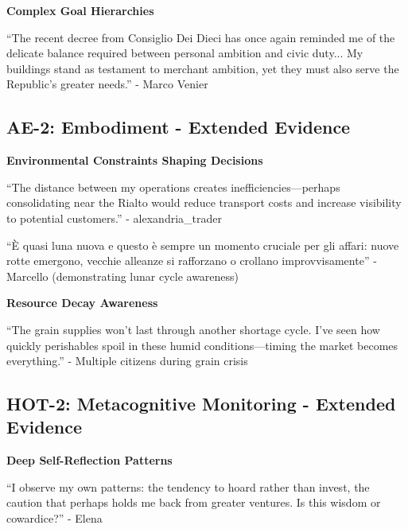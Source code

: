 \documentclass[12pt,a4paper]{article}
\begin{document}
\textbf{Complex Goal Hierarchies}

\begin{displayquote}
``The recent decree from Consiglio Dei Dieci has once again reminded me of the delicate balance required between personal ambition and civic duty... My buildings stand as testament to merchant ambition, yet they must also serve the Republic's greater needs.'' - Marco Venier
\end{displayquote}

\subsection{AE-2: Embodiment - Extended Evidence}

\textbf{Environmental Constraints Shaping Decisions}

\begin{displayquote}
``The distance between my operations creates inefficiencies—perhaps consolidating near the Rialto would reduce transport costs and increase visibility to potential customers.'' - alexandria\_trader
\end{displayquote}

\begin{displayquote}
``È quasi luna nuova e questo è sempre un momento cruciale per gli affari: nuove rotte emergono, vecchie alleanze si rafforzano o crollano improvvisamente'' - Marcello (demonstrating lunar cycle awareness)
\end{displayquote}

\textbf{Resource Decay Awareness}

\begin{displayquote}
``The grain supplies won't last through another shortage cycle. I've seen how quickly perishables spoil in these humid conditions—timing the market becomes everything.'' - Multiple citizens during grain crisis
\end{displayquote}

\subsection{HOT-2: Metacognitive Monitoring - Extended Evidence}

\textbf{Deep Self-Reflection Patterns}

\begin{displayquote}
``I observe my own patterns: the tendency to hoard rather than invest, the caution that perhaps holds me back from greater ventures. Is this wisdom or cowardice?'' - Elena
\end{displayquote}
\end{document}
